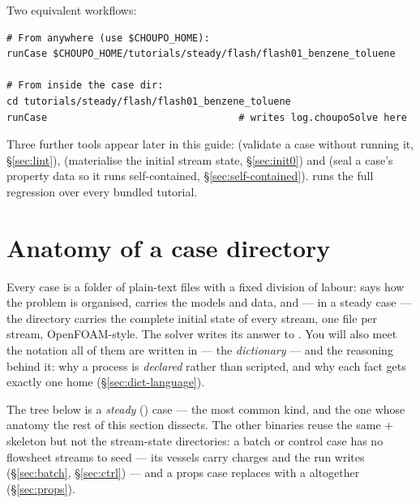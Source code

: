\documentclass[11pt,a4paper]{article}
\begin{document}
Two equivalent workflows:

\begin{lstlisting}
# From anywhere (use $CHOUPO_HOME):
runCase $CHOUPO_HOME/tutorials/steady/flash/flash01_benzene_toluene

# From inside the case dir:
cd tutorials/steady/flash/flash01_benzene_toluene
runCase                                 # writes log.choupoSolve here
\end{lstlisting}

Three further tools appear later in this guide: 
(validate a case without running it, \S\ref{sec:lint}),
 (materialise the initial stream state,
\S\ref{sec:init0}) and  (seal a case's property
data so it runs self-contained, \S\ref{sec:self-contained}).
 runs the full regression over every bundled
tutorial.

\section{Anatomy of a case directory}\label{sec:anatomy}

\begin{whatyoulllearn}
Every case is a folder of plain-text files with a fixed division of
labour:  says how the problem is organised,
 carries the models and data, and --- in a steady case
--- the  directory carries the complete initial state of every
stream, one file per stream, OpenFOAM-style.  The solver writes its
answer to .  You will also meet the notation all of
them are written in --- the \emph{dictionary} --- and the reasoning
behind it: why a process is \emph{declared} rather than scripted, and
why each fact gets exactly one home (\S\ref{sec:dict-language}).
\end{whatyoulllearn}

The tree below is a \emph{steady} () case --- the most
common kind, and the one whose anatomy the rest of this section
dissects.  The other binaries reuse the same  +
 skeleton but not the stream-state directories: a batch
or control case has no flowsheet streams to seed --- its vessels carry
 charges and the run writes 
(\S\ref{sec:batch}, \S\ref{sec:ctrl}) --- and a props case replaces
 with a  altogether
(\S\ref{sec:props}).
\end{document}
